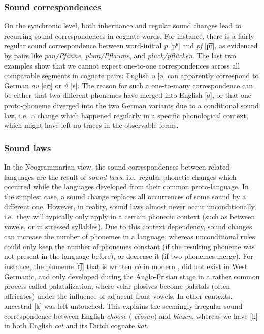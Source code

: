 \subsubsection{Sound correspondences}
On the synchronic level, both inheritance and regular sound changes lead to recurring sound correspondences in cognate words. For instance, there is a fairly regular sound correspondence between word-initial  \textit{p} {[pʰ]} and  \textit{pf} [p͡f], as evidenced by pairs like \textit{pan/Pfanne}, \textit{plum/Pflaume}, and \textit{pluck/pflücken}. The last two examples show that we cannot expect one-to-one correspondences across all comparable segments in cognate pairs: English \textit{u} [ø] can apparently correspond to German \textit{au} [ɑʊ̯] or \textit{ü} [ʏ]. The reason for such a one-to-many correspondence can be either that two different phonemes have merged into English [ø], or that one proto-phoneme diverged into the two German variants due to a conditional sound law, i.e.\ a change which happened regularly in a specific phonological context, which might have left no traces in the observable forms.

\subsubsection{Sound laws}
In the Neogrammarian view, the sound correspondences between related languages are the result of \textit{sound laws}, i.e.\ regular phonetic changes which occurred while the languages developed from their common proto-language. In the simplest case, a sound change replaces all occurrences of some sound by a different one. However, in reality, sound laws almost never occur unconditionally, i.e.\ they will typically only apply in a certain phonetic context (such as between vowels, or in stressed syllables). Due to this context dependency, sound changes can increase the number of phonemes in a language, whereas unconditional rules could only keep the number of phonemes constant (if the resulting phoneme was not present in the language before), or decrease it (if two phonemes merge). For instance, the phoneme [t͡ʃ] that is written \textit{ch} in modern , did not exist in West Germanic, and only developed during the Anglo-Frisian stage in a rather common process called 
palatalization, where velar plosives become palatals (often affricates) under the influence of adjacent front vowels. In other contexts, ancestral [k] was left untouched. This explains the seemingly irregular sound correspondence between English \textit{choose} ( \textit{ċēosan}) and  \textit{kiezen}, whereas we have [k] in both English \textit{cat} and its Dutch cognate \textit{kat}.

